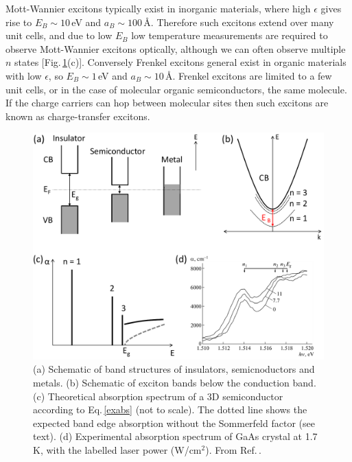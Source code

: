 Mott-Wannier excitons typically exist in inorganic materials, where high $\epsilon$ gives rise to $E_B \sim 10$\,eV and $a_B \sim 100$\,\AA. Therefore such excitons extend over many unit cells, and due to low $E_B$ low temperature measurements are required to observe Mott-Wannier excitons optically, although we can often observe multiple $n$ states [Fig.\,\ref{2Fig1}(c)]. Conversely Frenkel excitons general exist in organic materials with low $\epsilon$, so $E_B \sim 1$\,eV and $a_B \sim 10$\,\AA. Frenkel excitons are limited to a few unit cells, or in the case of molecular organic semiconductors, the same molecule. If the charge carriers can hop between molecular sites then such excitons are known as charge-transfer excitons.
\begin{figure}[ht] 
\centering    
\includegraphics[width=\textwidth]{Fig1}
\caption{(a) Schematic of band structures of insulators, semicnoductors and metals. (b) Schematic of exciton bands below the conduction band. (c) Theoretical absorption spectrum of a 3D semiconductor according to Eq.\,\ref{exabs} (not to scale). The dotted line shows the expected band edge absorption without the Sommerfeld factor (see text). (d) Experimental absorption spectrum of GaAs crystal at 1.7\,K, with the labelled laser power (W/cm$^2$). From Ref.\,\cite{Vaganov2013}.}
\label{2Fig1}
\end{figure}

